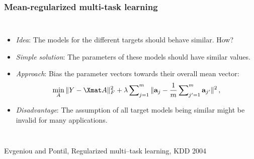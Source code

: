 \begin{frame}[t]
	\frametitle{Mean-regularized multi-task learning}
	
	\vspace{0.2cm}
	\begin{columns}
		\column{5cm}
		\footnotesize{
			\begin{itemize} 
%				
				\item \emph{Idea}: The models for the different targets should behave similar. How?
%				
				\item \emph{Simple solution}: The parameters of these models should have similar values.
%				
				\item \emph{Approach}: Bias the parameter vectors towards their overall mean vector:
					\vspace{0.2cm}
				\begin{equation*}
					\label{eq:meanreg}
					\min_A \|Y - \Xmat A \|^2_F + \lambda \sum\nolimits_{j=1}^m \|\ba_j - \frac{1}{m} \sum\nolimits_{j'=1}^m \ba_{j'} \|^2 \, ,
				\end{equation*}
%				
				\item \emph{Disadvantage}: The assumption of all target models being similar might be invalid for many applications. \lz
			\end{itemize}
		}
		\column{4.5cm}
		
%	
	\end{columns}

{\tiny Evgeniou and Pontil, Regularized multi--task learning, KDD 2004}
\end{frame}


